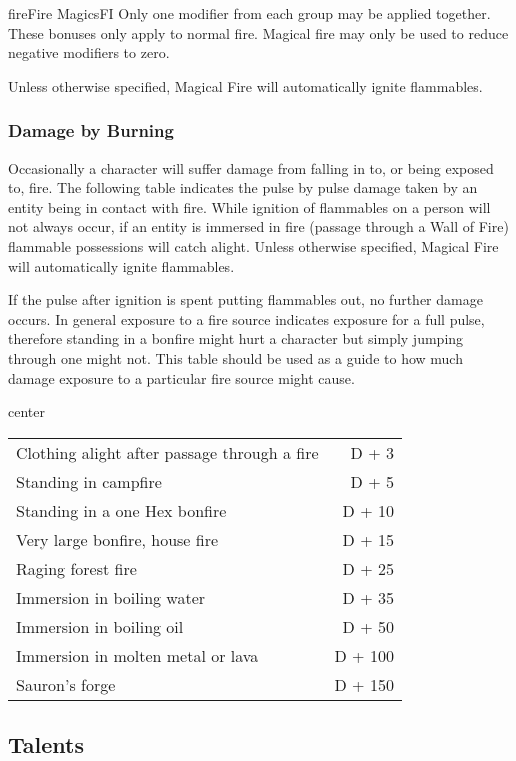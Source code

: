 \begin{college}[2.0]{fire}{Fire Magics}{FI}
Only one modifier from each group may be applied together. These
bonuses only apply to normal fire. Magical fire may only be used to
reduce negative modifiers to zero.

Unless otherwise specified, Magical Fire will automatically ignite
flammables.

\subsubsection{Damage by Burning}

Occasionally a character will suffer damage from falling in to, or
being exposed to, fire. The following table indicates the pulse by
pulse damage taken by an entity being in contact with fire. While
ignition of flammables on a person will not always occur, if an entity
is immersed in fire (\eg passage through a Wall of Fire) flammable
possessions will catch alight. Unless otherwise specified, Magical
Fire will automatically ignite flammables.

If the pulse after ignition is spent putting flammables out, no
further damage occurs. In general exposure to a fire source indicates
exposure for a full pulse, therefore standing in a bonfire might hurt
a character but simply jumping through one might not. This table
should be used as a guide to how much damage exposure to a particular
fire source might cause.

\begin{inset}{\small}{center}
\begin{tabularx}{\linewidth}{Xr}
Clothing alight after passage through a fire	&  D + 3 \\
Standing in campfire &  D + 5 \\
Standing in a one Hex bonfire &  D + 10 \\
Very large bonfire, house fire &  D + 15 \\
Raging forest fire &  D + 25 \\
Immersion in boiling water &  D + 35 \\
Immersion in boiling oil &  D + 50 \\
Immersion in molten metal or lava &  D + 100 \\
Sauron's forge &  D + 150 \\
\end{tabularx}
\end{inset}

\subsection{Talents}


\end{college}
